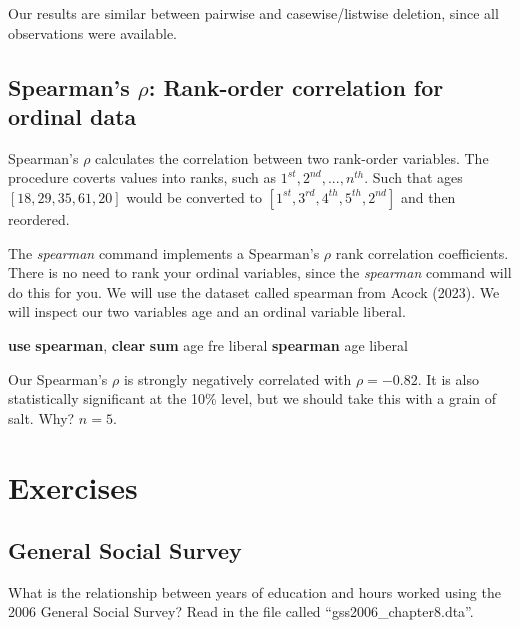 \documentclass[
]{book}
\newenvironment{Shaded}{\begin{snugshade}}{\end{snugshade}}
\newcommand{\KeywordTok}[1]{\textcolor[rgb]{0.13,0.29,0.53}{\textbf{#1}}}
\newcommand{\NormalTok}[1]{#1}
\begin{document}
Our results are similar between pairwise and casewise/listwise deletion, since all observations were available.

\section{\texorpdfstring{Spearman's \(\rho\): Rank-order correlation for ordinal data}{Spearman's \textbackslash rho: Rank-order correlation for ordinal data}}\label{spearmans-rho-rank-order-correlation-for-ordinal-data}

Spearman's \(\rho\) calculates the correlation between two rank-order variables. The procedure coverts values into ranks, such as \(1^{st}, 2^{nd}, ..., n^{th}\). Such that ages \([18, 29, 35, 61, 20]\) would be converted to \([1^{st}, 3^{rd}, 4^{th}, 5^{th}, 2^{nd}]\) and then reordered.

The \emph{spearman} command implements a Spearman's \(\rho\) rank correlation coefficients. There is no need to rank your ordinal variables, since the \emph{spearman} command will do this for you. We will use the dataset called spearman from Acock (2023). We will inspect our two variables age and an ordinal variable liberal.

\begin{Shaded}
\begin{Highlighting}[]
\KeywordTok{use} \KeywordTok{spearman}\NormalTok{, }\KeywordTok{clear}
\KeywordTok{sum}\NormalTok{ age}
\NormalTok{fre liberal}
\KeywordTok{spearman}\NormalTok{ age liberal}
\end{Highlighting}
\end{Shaded}

Our Spearman's \(\rho\) is strongly negatively correlated with \(\rho=-0.82\). It is also statistically significant at the 10\% level, but we should take this with a grain of salt. Why? \(n=5\).

\chapter{Exercises}\label{exercises}

\section{General Social Survey}\label{general-social-survey-1}

What is the relationship between years of education and hours worked using the 2006 General Social Survey? Read in the file called ``gss2006\_chapter8.dta''.
\end{document}
